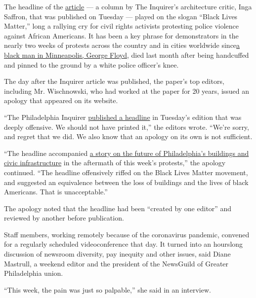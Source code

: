 The headline of the
\href{https://www.inquirer.com/columnists/floyd-protest-center-city-philadelphia-lootings-52nd-street-walnut-chestnut-street-20200601.html}{article}
--- a column by The Inquirer's architecture critic, Inga Saffron, that
was published on Tuesday --- played on the slogan ``Black Lives
Matter,'' long a rallying cry for civil rights activists protesting
police violence against African Americans. It has been a key phrase for
demonstrators in the nearly two weeks of protests across the country and
in cities worldwide
since\href{https://www.nytimes3xbfgragh.onion/2020/05/27/us/george-floyd-minneapolis-death.html}{a
black man in Minneapolis, George Floyd}, died last month after being
handcuffed and pinned to the ground by a white police officer's knee.

The day after the Inquirer article was published, the paper's top
editors, including Mr. Wischnowski, who had worked at the paper for 20
years, issued an apology that appeared on its website.

``The Philadelphia Inquirer
\href{https://www.inquirer.com/resizer/flGyvZx2v2J6HP5LvtQfjXi_vRo=/arc-anglerfish-arc2-prod-pmn/public/6BESMREBLFHEHFZXJPMYNC7BXE.png}{published
a headline} in Tuesday's edition that was deeply offensive. We should
not have printed it,'' the editors wrote. ``We're sorry, and regret that
we did. We also know that an apology on its own is not sufficient.

``The headline accompanied
\href{https://www.inquirer.com/columnists/floyd-protest-center-city-philadelphia-lootings-52nd-street-walnut-chestnut-street-20200601.html}{a
story on the future of Philadelphia's buildings and civic
infrastructure} in the aftermath of this week's protests,'' the apology
continued. ``The headline offensively riffed on the Black Lives Matter
movement, and suggested an equivalence between the loss of buildings and
the lives of black Americans. That is unacceptable.''

The apology noted that the headline had been ``created by one editor''
and reviewed by another before publication.

Staff members, working remotely because of the coronavirus pandemic,
convened for a regularly scheduled videoconference that day. It turned
into an hourslong discussion of newsroom diversity, pay inequity and
other issues, said Diane Mastrull, a weekend editor and the president of
the NewsGuild of Greater Philadelphia union.

``This week, the pain was just so palpable,'' she said in an interview.

